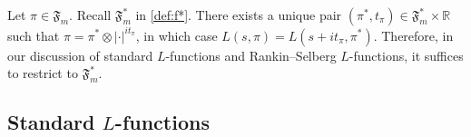 \documentclass[12pt,reqno]{amsart}
\theoremstyle{remark}
\numberwithin{equation}{section}
\begin{document}

    Let $\pi\in\mathfrak{F}_{m}$.  Recall $\mathfrak{F}_{m}^*$ in \eqref{def:f*}.  There exists a unique pair $(\pi^*,t_{\pi})\in\mathfrak{F}_{m}^*\times\mathbb{R}$ such that $\pi=\pi^*\otimes|\cdot|^{it_{\pi}}$, in which case $L(s,\pi)=L(s+it_{\pi},\pi^*)$.  Therefore, in our discussion of standard $L$-functions and Rankin--Selberg $L$-functions, it suffices to restrict to $\mathfrak{F}_{m}^*$.

    \subsection{Standard \texorpdfstring{$L$}{L}-functions}
    \label{subsec: standardL}

	
\end{document}
